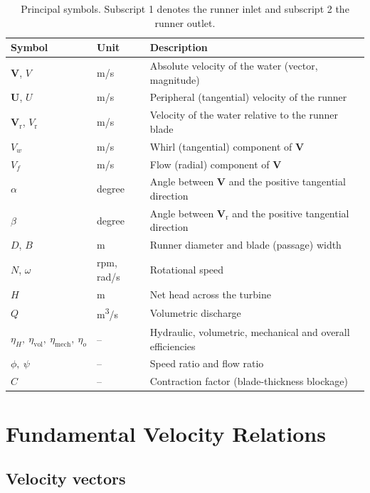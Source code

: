 \documentclass[11pt,a4paper]{article}
\numberwithin{equation}{section}
\newcommand{\vr}{\mathrm{r}}
\newcommand{\vvec}[1]{\bm{#1}}
\begin{document}
\begin{table}[h!]
\centering
\begin{tabular}{@{}llp{7.6cm}@{}}
\toprule
Symbol & Unit & Description\\
\midrule
$\vvec{V}$, $V$ & \si{m/s} & Absolute velocity of the water (vector, magnitude)\\
$\vvec{U}$, $U$ & \si{m/s} & Peripheral (tangential) velocity of the runner\\
$\vvec{V}_\vr$, $V_\vr$ & \si{m/s} & Velocity of the water relative to the runner blade\\
$V_w$ & \si{m/s} & Whirl (tangential) component of $\vvec{V}$\\
$V_f$ & \si{m/s} & Flow (radial) component of $\vvec{V}$\\
$\alpha$ & degree & Angle between $\vvec{V}$ and the positive tangential direction\\
$\beta$ & degree & Angle between $\vvec{V}_\vr$ and the positive tangential direction\\
$D$, $B$ & \si{m} & Runner diameter and blade (passage) width\\
$N$, $\omega$ & rpm, \si{rad/s} & Rotational speed\\
$H$ & \si{m} & Net head across the turbine\\
$Q$ & \si{m^3/s} & Volumetric discharge\\
$\eta_H,\ \eta_{\mathrm{vol}},\ \eta_{\mathrm{mech}},\ \eta_o$ & -- & Hydraulic, volumetric, mechanical and overall efficiencies\\
$\phi,\ \psi$ & -- & Speed ratio and flow ratio\\
$C$ & -- & Contraction factor (blade-thickness blockage)\\
\bottomrule
\end{tabular}
\caption{Principal symbols. Subscript 1 denotes the runner inlet and subscript 2 the runner outlet.}
\label{tab:nomenclature}
\end{table}

\section{Fundamental Velocity Relations}
\label{sec:fundamentals}

\subsection{Velocity vectors}
\end{document}
